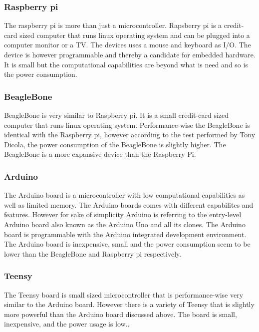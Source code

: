 \subsubsection{Raspberry pi}
The raspberry pi is more than just a microcontroller. Rapsberry pi is a credit-card sized computer that runs linux operating system and can be plugged into a computer monitor or a TV. The devices uses a mouse and keyboard as I/O. The device is however programmable and thereby a candidate for embedded hardware. It is small but the computational capabilities are beyond what is need and so is the power consumption\cite{power_usage}. 

\subsubsection{BeagleBone}
BeagleBone is very similar to Raspberry pi. It is a small credit-card sized computer that runs linux operating system. Performance-wise the BeagleBone is identical with the Raspberry pi, however according to the test performed by Tony Dicola\cite{power_usage}, the power consumption of the BeagleBone is slightly higher. The BeagleBone is a more expansive device than the Raspberry Pi.

\subsubsection{Arduino}
The Arduino board is a microcontroller with low computational capabilities as well as limited memory. The Arduino boards comes with different capabilites and features. However for sake of simplicity Arduino is referring to the entry-level Arduino board also known as the Arduino Uno and all its clones. The Arduino board is programmable with the Arduino integrated development environment. The Arduino board is inexpensive, small and the power consumption seem to be lower than the  BeagleBone and Raspberry pi respectively\cite{power_usage_ard}. 

\subsubsection{Teensy}
The Teensy board is small sized microcontroller that is performance-wise very similar to the Arduino board. However there is a variety of Teensy that is slightly more powerful than the Arduino board discussed above. The board is small, inexpensive, and the power usage is low.\cite{power_usage_teen}.

